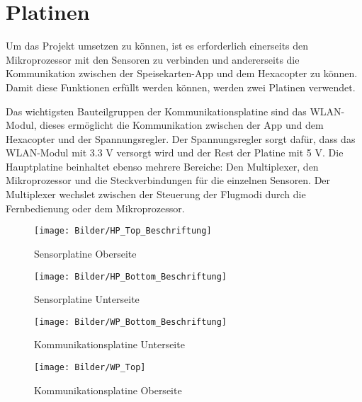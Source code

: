 \section{Platinen}
Um das Projekt umsetzen zu können, ist es erforderlich einerseits den Mikroprozessor mit den Sensoren zu verbinden und andererseits die Kommunikation zwischen der Speisekarten-App und dem Hexacopter zu können.
Damit diese Funktionen erfüllt werden können, werden zwei Platinen verwendet.

Das wichtigsten Bauteilgruppen der Kommunikationsplatine sind das WLAN-Modul, dieses ermöglicht die Kommunikation zwischen der App und dem Hexacopter und der Spannungsregler. Der Spannungsregler sorgt dafür, dass das WLAN-Modul mit 3.3 V versorgt wird und der Rest der Platine mit 5 V.
Die Hauptplatine beinhaltet ebenso mehrere Bereiche: Den Multiplexer, den Mikroprozessor und die Steckverbindungen für die einzelnen Sensoren.
Der Multiplexer wechslet zwischen der Steuerung der Flugmodi durch die Fernbedienung oder dem Mikroprozessor.
\newpage
\begin{figure}[t]
\begin{centering}
\texttt{[image: Bilder/HP\_Top\_Beschriftung]}
\par\end{centering}
\caption{Sensorplatine Oberseite}
\label{Sensor Platine oben}
\end{figure}

\begin{figure}[b]
\begin{centering}
\texttt{[image: Bilder/HP\_Bottom\_Beschriftung]}
\par\end{centering}
\caption{Sensorplatine Unterseite}
\label{Sensor Platine unten}
\end{figure}


\begin{figure}[t]
\begin{centering}
\texttt{[image: Bilder/WP\_Bottom\_Beschriftung]}
\par\end{centering}
\caption{Kommunikationsplatine Unterseite}
\label{WLAN Platine oben}
\end{figure}

\begin{figure}[b]
\begin{centering}
\texttt{[image: Bilder/WP\_Top]}
\par\end{centering}
\caption{Kommunikationsplatine Oberseite}
\label{WLAN Platine unten}
\end{figure}
